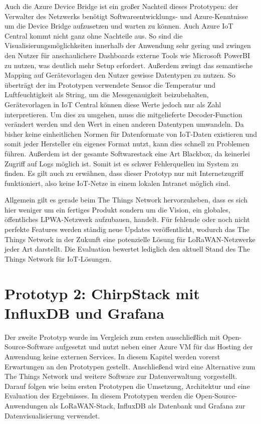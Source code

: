 Auch die Azure Device Bridge ist ein großer Nachteil dieses Prototypen: der Verwalter des Netzwerks benötigt Softwareentwicklungs- und Azure-Kenntnisse um die Device Bridge aufzusetzen und warten zu können. Auch Azure IoT Central kommt nicht ganz ohne Nachteile aus. So sind die Visualisierungsmöglichkeiten innerhalb der Anwendung sehr gering und zwingen den Nutzer für anschaulichere Dashboards externe Tools wie Microsoft PowerBI zu nutzen, was deutlich mehr Setup erfordert. Außerdem zwingt das semantische Mapping auf Gerätevorlagen den Nutzer gewisse Datentypen zu nutzen. So überträgt der im Prototypen verwendete Sensor die Temperatur und Luftfeuchtigkeit als String, um die Messgenauigkeit beizubehalten, Gerätevorlagen in IoT Central können diese Werte jedoch nur als Zahl interpre\-tieren. Um dies zu umgehen, muss die mitgelieferte Decoder-Function verändert werden und den Wert in einen anderen Datentypen umwandeln. Da bisher keine einheitlichen Normen für Datenformate von IoT-Daten existieren und somit jeder Hersteller ein eigenes Format nutzt, kann dies schnell zu Problemen führen. Außerdem ist der gesamte Softwarestack eine Art Blackbox, da keinerlei Zugriff auf Logs möglich ist. Somit ist es schwer Fehlerquellen im System zu finden. Es gilt auch zu erwähnen, dass dieser Prototyp nur mit Internetzugriff funktioniert, also keine IoT-Netze in einem lokalen Intranet möglich sind.

Allgemein gilt es gerade beim The Things Network hervorzuheben, dass es sich hier weniger um ein fertiges Produkt sondern um die Vision, ein globales, öffentliches LPWA-Netzwerk aufzubauen, handelt. Für fehlende oder noch nicht perfekte Features werden ständig neue Updates veröffentlicht, wodurch das The Things Network in der Zukunft eine potenzielle Lösung für LoRaWAN-Netzwerke jeder Art darstellt. Die Evaluation bewertet lediglich den aktuell Stand des The Things Network für IoT-Lösungen.

\newpage

\section{Prototyp 2: ChirpStack mit InfluxDB und Grafana}
\label{sec:Prot:version2}

Der zweite Prototyp wurde im Vergleich zum ersten ausschließlich mit Open-Source-Software aufgesetzt und nutzt neben einer Azure VM für das Hosting der Anwendung keine externen Services. In diesem Kapitel werden vorerst Erwartungen an den Prototypen gestellt. Anschließend wird eine Alternative zum The Things Network und weitere Software zur Datenverwaltung vorgestellt. Darauf folgen wie beim ersten Prototypen die Umsetzung, Architektur und eine Evaluation des Ergebnisses. In diesem Prototypen werden die Open-Source-Anwendungen  als LoRaWAN-Stack, InfluxDB als Datenbank und Grafana zur Datenvisualisierung verwendet. 

